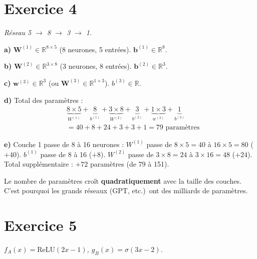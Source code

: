 \section*{Exercice 4 \hfill \exofondamental}
\textit{R\'{e}seau 5 $\to$ 8 $\to$ 3 $\to$ 1.}

\separateur

\textbf{a)} $\mathbf{W}^{(1)} \in \mathbb{R}^{8 \times 5}$ (8 neurones, 5 entr\'{e}es).
$\mathbf{b}^{(1)} \in \mathbb{R}^{8}$.

\textbf{b)} $\mathbf{W}^{(2)} \in \mathbb{R}^{3 \times 8}$ (3 neurones, 8 entr\'{e}es).
$\mathbf{b}^{(2)} \in \mathbb{R}^{3}$.

\textbf{c)} $\mathbf{w}^{(3)} \in \mathbb{R}^{3}$ (ou $\mathbf{W}^{(3)} \in \mathbb{R}^{1 \times 3}$).
$b^{(3)} \in \mathbb{R}$.

\textbf{d)} Total des param\`{e}tres :
\begin{align*}
    &\underbrace{8 \times 5}_{W^{(1)}} + \underbrace{8}_{b^{(1)}} + \underbrace{3 \times 8}_{W^{(2)}} + \underbrace{3}_{b^{(2)}} + \underbrace{1 \times 3}_{w^{(3)}} + \underbrace{1}_{b^{(3)}} \\
    &= 40 + 8 + 24 + 3 + 3 + 1 = \boxed{79 \text{ param\`{e}tres}}
\end{align*}

\textbf{e)} Couche 1 passe de 8 \`{a} 16 neurones :
$W^{(1)}$ passe de $8 \times 5 = 40$ \`{a} $16 \times 5 = 80$ ($+40$).
$b^{(1)}$ passe de 8 \`{a} 16 ($+8$).
$W^{(2)}$ passe de $3 \times 8 = 24$ \`{a} $3 \times 16 = 48$ ($+24$).
Total suppl\'{e}mentaire : $\boxed{+72}$ param\`{e}tres (de 79 \`{a} 151).

\begin{retenirbox}
    Le nombre de param\`{e}tres cro\^{i}t \textbf{quadratiquement} avec la taille des couches.
    C'est pourquoi les grands r\'{e}seaux (GPT, etc.)\ ont des milliards de param\`{e}tres.
\end{retenirbox}

\section*{Exercice 5 \hfill \exointermediaire}
\textit{$f_A(x) = \text{ReLU}(2x-1)$, $g_B(x) = \sigma(3x-2)$.}

